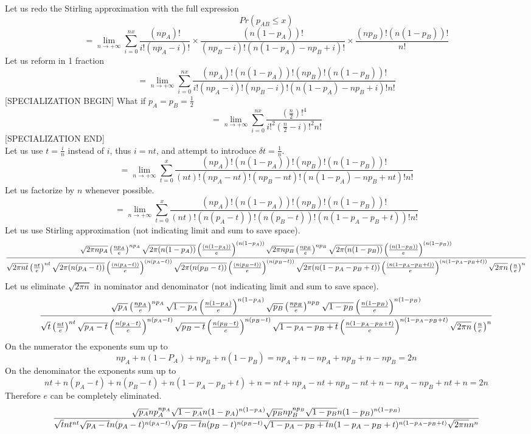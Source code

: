 \documentclass[]{article}
\begin{document}
Let us redo the Stirling approximation with the full expression
$$Pr(p_{AB} \leq x)$$
$$=\lim_{n\to +\infty} \sum_{i=0}^{n x} \frac{(n p_A)!}{i! (n p_A -
  i)!} \times \frac{(n (1-p_A))!}{(n p_B - i)! (n (1-p_A) - n p_B + i)!}
\times \frac{(n p_B)! (n (1 - p_B))!}{n!}$$
Let us reform in 1 fraction
$$=\lim_{n\to +\infty} \sum_{i=0}^{n x}
\frac{(n p_A)! (n (1-p_A))! (n p_B)! (n (1 - p_B))!}
     {i! (n p_A - i)! (n p_B - i)! (n (1-p_A) - n p_B + i)! n!}$$
[SPECIALIZATION BEGIN] What if $p_A = p_B = \frac{1}{2}$
$$=\lim_{n\to +\infty} \sum_{i=0}^{n x}
\frac{\left(\frac{n}{2}\right)!^4}
     {i!^2 \left(\frac{n}{2} - i\right)!^2 n!}$$
[SPECIALIZATION END]\\
Let us use $t = \frac{i}{n}$ instead of $i$, thus $i = n t$, and
attempt to introduce $\delta t = \frac{1}{n}$.
$$=\lim_{n\to +\infty} \sum_{t=0}^{x}
\frac{(n p_A)! (n (1-p_A))! (n p_B)! (n (1 - p_B))!}
     {(n t)! (n p_A - n t)! (n p_B - n t)! (n (1-p_A) - n p_B + n t)! n!}$$
Let us factorize by $n$ whenever possible.
$$=\lim_{n\to +\infty} \sum_{t=0}^{x}
\frac{(n p_A)! (n (1-p_A))! (n p_B)! (n (1 - p_B))!}
     {(n t)! (n (p_A - t))! (n (p_B - t))! (n (1 - p_A - p_B + t))!
       n!}$$
Let us use Stirling approximation (not indicating limit and sum to
save space).
{\tiny
$$
\frac{\sqrt{2\pi n p_A} \left(\frac{n p_A}{e}\right)^{n p_A} \sqrt{2\pi(n (1-p_A))} \left(\frac{(n (1-p_A))}{e}\right)^{(n (1-p_A))} \sqrt{2\pi n p_B} \left(\frac{n p_B}{e}\right)^{n p_B} \sqrt{2\pi(n (1 - p_B))} \left(\frac{(n (1 - p_B))}{e}\right)^{(n (1 - p_B))}}
     {\sqrt{2\pi n t} \left(\frac{n t}{e}\right)^{n t} \sqrt{2\pi(n (p_A - t))} \left(\frac{(n (p_A - t))}{e}\right)^{(n (p_A - t))} \sqrt{2\pi(n (p_B - t))} \left(\frac{(n (p_B - t))}{e}\right)^{(n (p_B - t))} \sqrt{2\pi(n (1 - p_A - p_B + t))} \left(\frac{(n (1 - p_A - p_B + t))}{e}\right)^{(n (1 - p_A - p_B + t))}
       \sqrt{2\pi n} \left(\frac{n}{e}\right)^{n}}$$
     }
Let us eliminate $\sqrt{2\pi n}$ in nominator and denominator  (not indicating limit and sum to
save space).
{\small
$$
\frac{\sqrt{p_A}\left(\frac{n p_A}{e}\right)^{n p_A} \sqrt{1 - p_A}\left(\frac{n (1 - p_A)}{e}\right)^{n (1 - p_A)}
      \sqrt{p_B}\left(\frac{n p_B}{e}\right)^{n p_B} \sqrt{1 - p_B}\left(\frac{n (1 - p_B)}{e}\right)^{n (1 - p_B)}}
     {\sqrt{t}\left(\frac{n t}{e}\right)^{n t} \sqrt{p_A - t}\left(\frac{n (p_A - t)}{e}\right)^{n (p_A - t)}
      \sqrt{p_B - t}\left(\frac{n (p_B - t)}{e}\right)^{n (p_B - t)} \sqrt{1 - p_A - p_B +
        t}\left(\frac{n (1 - p_A - p_B + t)}{e}\right)^{n (1 - p_A - p_B + t)} \sqrt{2\pi n} \left(\frac{n}{e}\right)^{n}}$$
     }
On the numerator the exponents sum up to
$$n p_A + n(1 - P_A) + n p_B + n (1 - p_B) = n p_A + n - n p_A + n p_B
+ n - n p_B = 2n$$
On the denominator the exponents sum up to
$$n t + n (p_A - t) + n (p_B - t) + n (1 - p_A - p_B + t) + n = n t +
n p_A - n t + n p_B - n t + n - n p_A - n p_B + n t + n = 2n$$
Therefore $e$ can be completely eliminated.
$$
\frac{\sqrt{p_A}n p_A^{n p_A} \sqrt{1 - p_A}n (1 - p_A)^{n (1 - p_A)}
      \sqrt{p_B}n p_B^{n p_B} \sqrt{1 - p_B}n (1 - p_B)^{n (1 - p_B)}}
     {\sqrt{t}n t^{n t} \sqrt{p_A - t}n (p_A - t)^{n (p_A - t)}
      \sqrt{p_B - t}n (p_B - t)^{n (p_B - t)} \sqrt{1 - p_A - p_B +
        t}n (1 - p_A - p_B + t)^{n (1 - p_A - p_B + t)} \sqrt{2\pi n} n^n}$$
\end{document}
